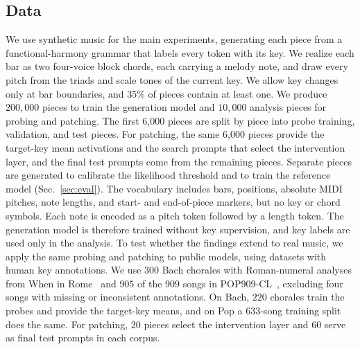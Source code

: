 \documentclass{article}
\begin{document}
\subsection{Data}
\label{sec:data}
We use synthetic music for the main experiments, generating each piece from a functional-harmony grammar that labels every token with its key.
We realize each bar as two four-voice block chords, each carrying a melody note, and draw every pitch from the triads and scale tones of the current key.
We allow key changes only at bar boundaries, and $35\%$ of pieces contain at least one.
We produce $200{,}000$ pieces to train the generation model and $10{,}000$ analysis pieces for probing and patching.
The first 6,000 pieces are split by piece into probe training, validation, and test pieces.
For patching, the same 6,000 pieces provide the target-key mean activations and the search prompts that select the intervention layer, and the final test prompts come from the remaining pieces.
Separate pieces are generated to calibrate the likelihood threshold and to train the reference model (Sec.~\ref{sec:eval}).
The vocabulary includes bars, positions, absolute MIDI pitches, note lengths, and start- and end-of-piece markers, but no key or chord symbols.
Each note is encoded as a pitch token followed by a length token.
The generation model is therefore trained without key supervision, and key labels are used only in the analysis.
To test whether the findings extend to real music, we apply the same probing and patching to public models, using datasets with human key annotations.
We use $300$ Bach chorales with Roman-numeral analyses from When in Rome~\cite{gotham2023wir} and $905$ of the $909$ songs in POP909-CL~\cite{pop909cl2026}, excluding four songs with missing or inconsistent annotations.
On Bach, $220$ chorales train the probes and provide the target-key means, and on Pop a $633$-song training split does the same.
For patching, $20$ pieces select the intervention layer and $60$ serve as final test prompts in each corpus.
\end{document}

